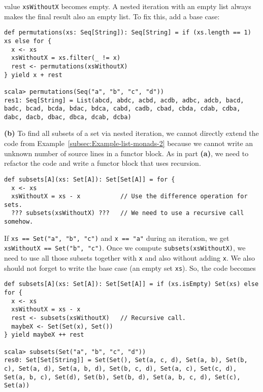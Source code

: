 value \lstinline!xsWithoutX! becomes empty. A nested iteration with
an empty list always makes the final result also an empty list. To
fix this, add a base case:
\begin{lstlisting}
def permutations(xs: Seq[String]): Seq[String] = if (xs.length == 1) xs else for {
  x <- xs
  xsWithoutX = xs.filter(_ != x)
  rest <- permutations(xsWithoutX)
} yield x + rest

scala> permutations(Seq("a", "b", "c", "d"))
res1: Seq[String] = List(abcd, abdc, acbd, acdb, adbc, adcb, bacd, badc, bcad, bcda, bdac, bdca, cabd, cadb, cbad, cbda, cdab, cdba, dabc, dacb, dbac, dbca, dcab, dcba) 
\end{lstlisting}

\textbf{(b)} To find all subsets of a set via nested iteration, we
cannot directly extend the code from Example~\ref{subsec:Example-list-monads-2}
because we cannot write an unknown number of source lines in a functor
block. As in part \textbf{(a)}, we need to refactor the code and write
a functor block that uses recursion.
\begin{lstlisting}
def subsets[A](xs: Set[A]): Set[Set[A]] = for {
  x <- xs
  xsWithoutX = xs - x           // Use the difference operation for sets.
  ??? subsets(xsWithoutX) ???   // We need to use a recursive call somehow.
\end{lstlisting}
If \lstinline!xs == Set("a", "b", "c")! and \lstinline!x == "a"!
during an iteration, we get \lstinline!xsWithoutX == Set("b", "c")!.
Once we compute \lstinline!subsets(xsWithoutX)!, we need to use all
those subsets together with \lstinline!x! and also without adding
\lstinline!x!. We also should not forget to write the base case (an
empty set \lstinline!xs!). So, the code becomes
\begin{lstlisting}
def subsets[A](xs: Set[A]): Set[Set[A]] = if (xs.isEmpty) Set(xs) else for {
  x <- xs
  xsWithoutX = xs - x
  rest <- subsets(xsWithoutX)   // Recursive call.
  maybeX <- Set(Set(x), Set())
} yield maybeX ++ rest

scala> subsets(Set("a", "b", "c", "d"))
res0: Set[Set[String]] = Set(Set(), Set(a, c, d), Set(a, b), Set(b, c), Set(a, d), Set(a, b, d), Set(b, c, d), Set(a, c), Set(c, d), Set(a, b, c), Set(d), Set(b), Set(b, d), Set(a, b, c, d), Set(c), Set(a)) 
\end{lstlisting}

